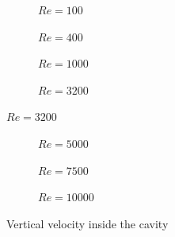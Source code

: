\begin{figure}[h]
	\centering
	\begin{subfigure}{0.5\textwidth}
		\resizebox{1.4\textwidth}{!}{}
		\caption{$Re=100$}
	\end{subfigure}%
	\begin{subfigure}{0.5\textwidth}
		\resizebox{1.4\textwidth}{!}{}
		\caption{$Re=400$}
	\end{subfigure}
	\begin{subfigure}{0.5\textwidth}
		\resizebox{1.4\textwidth}{!}{}
		\caption{$Re=1000$}
	\end{subfigure}%
	\begin{subfigure}{0.5\textwidth}
		\resizebox{1.4\textwidth}{!}{}
		\caption{$Re=3200$}
	\end{subfigure}
\end{figure}
\begin{figure}\ContinuedFloat
	\begin{subfigure}{0.5\textwidth}
		\resizebox{1.4\textwidth}{!}{}
		\caption{$Re=5000$}
	\end{subfigure}%
	\begin{subfigure}{0.5\textwidth}
		\resizebox{1.4\textwidth}{!}{}
		\caption{$Re=7500$}
	\end{subfigure}
	\begin{subfigure}{0.5\textwidth}
		\center
		\resizebox{1.4\textwidth}{!}{}
		\caption{$Re=10000$}
	\end{subfigure}
	\caption{Vertical velocity inside the cavity}
\end{figure}


